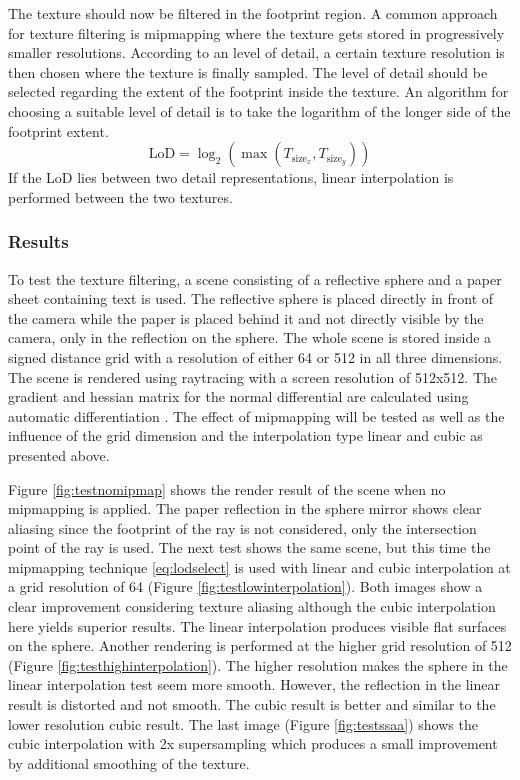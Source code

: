 \documentclass[12pt]{article}
\newcommand{\testscreenres}{512x512}
\newcommand{\testlowres}{64}
\newcommand{\testhighres}{512}
\begin{document}
The texture should now be filtered in the footprint region. A common approach for texture filtering is mipmapping \cite{williams:1983} where the texture gets stored in progressively smaller resolutions. According to an level of detail, a certain texture resolution is then chosen where the texture is finally sampled. The level of detail should be selected regarding the extent of the footprint inside the texture. An algorithm for choosing a suitable level of detail is to take the logarithm of the longer side of the footprint extent.
\begin{equation} \label{eq:lodselect}
\text{LoD} = \log_2 \left( \max \left( T_{\text{size}_x}, T_{\text{size}_y} \right) \right)
\end{equation}
If the LoD lies between two detail representations, linear interpolation is performed between the two textures. 

\subsubsection{Results}
To test the texture filtering, a scene consisting of a reflective sphere and a paper sheet containing text is used. The reflective sphere is placed directly in front of the camera while the paper is placed behind it and not directly visible by the camera, only in the reflection on the sphere. The whole scene is stored inside a signed distance grid with a resolution of either \testlowres{}  or \testhighres{}  in all three dimensions. The scene is rendered using raytracing with a screen resolution of \testscreenres{}. The gradient and hessian matrix for the normal differential are calculated using automatic differentiation \cite{gower:2010}. The effect of mipmapping will be tested as well as the influence of the grid dimension and the interpolation type linear and cubic as presented above.



Figure \ref{fig:testnomipmap} shows the render result of the scene when no mipmapping is applied. The paper reflection in the sphere mirror shows clear aliasing since the footprint of the ray is not considered, only the intersection point of the ray is used. The next test shows the same scene, but this time the mipmapping technique \eqref{eq:lodselect} is used with linear and cubic interpolation at a grid resolution of \testlowres{} (Figure \ref{fig:testlowinterpolation}). Both images show a clear improvement considering texture aliasing although the cubic interpolation here yields superior results. The linear interpolation produces visible flat surfaces on the sphere. Another rendering is performed at the higher grid resolution of \testhighres{} (Figure \ref{fig:testhighinterpolation}). The higher resolution makes the sphere in the linear interpolation test seem more smooth. However, the reflection in the linear result is distorted and not smooth. The cubic result is better and similar to the lower resolution cubic result. The last image (Figure \ref{fig:testssaa}) shows the cubic interpolation with 2x supersampling which produces a small improvement by additional smoothing of the texture.
\end{document}
